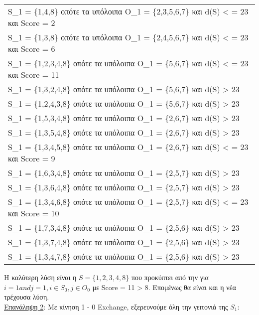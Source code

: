 \documentclass[12pt, a4paper]{article}
\begin{document}
\begin{table}[H]
\centering
\label{my-label}
\begin{tabular}{l}
S\_1 = \{1,4,8\} οπότε τα υπόλοιπα Ο\_1 = \{2,3,5,6,7\} και d(S) < = 23 και Score =  2\\
S\_1 = \{1,3,8\} οπότε τα υπόλοιπα Ο\_1 = \{2,4,5,6,7\} και d(S) < = 23 και Score =  6\\
S\_1 = \{1,2,3,4,8\} οπότε τα υπόλοιπα Ο\_1 = \{5,6,7\} και d(S) < = 23 και Score =  11\\
S\_1 = \{1,3,2,4,8\} οπότε τα υπόλοιπα Ο\_1 = \{5,6,7\} και d(S) > 23\\
S\_1 = \{1,2,4,3,8\} οπότε τα υπόλοιπα Ο\_1 = \{5,6,7\} και d(S) > 23\\
S\_1 = \{1,5,3,4,8\} οπότε τα υπόλοιπα Ο\_1 = \{2,6,7\} και d(S) > 23\\
S\_1 = \{1,3,5,4,8\} οπότε τα υπόλοιπα Ο\_1 = \{2,6,7\} και d(S) > 23\\
S\_1 = \{1,3,4,5,8\} οπότε τα υπόλοιπα Ο\_1 = \{2,6,7\} και d(S) < = 23 και Score =  9\\
S\_1 = \{1,6,3,4,8\} οπότε τα υπόλοιπα Ο\_1 = \{2,5,7\} και d(S) > 23\\
S\_1 = \{1,3,6,4,8\} οπότε τα υπόλοιπα Ο\_1 = \{2,5,7\} και d(S) > 23 \\
S\_1 = \{1,3,4,6,8\} οπότε τα υπόλοιπα Ο\_1 = \{2,5,7\} και d(S) < = 23 και Score =  10\\
S\_1 = \{1,7,3,4,8\} οπότε τα υπόλοιπα Ο\_1 = \{2,5,6\} και d(S) > 23\\
S\_1 = \{1,3,7,4,8\} οπότε τα υπόλοιπα Ο\_1 = \{2,5,6\} και d(S) > 23 \\
S\_1 = \{1,3,4,7,8\} οπότε τα υπόλοιπα Ο\_1 = \{2,5,6\} και d(S) > 23\\
\end{tabular}
\end{table}

Η καλύτερη λύση είναι η \(S = \{1,2,3,4,8\}\)  που προκύπτει από την για \(i = 1 and j = 1, i \in S_0,  j \in O_0\) με Score = 11 > 8.	Επομένως θα είναι και η νέα τρέχουσα λύση. \\


\underline{Επανάληψη 2}: Με κίνηση 1 - 0 Exchange, εξερευνούμε όλη την γειτονιά της \(S_1\):
\end{document}
